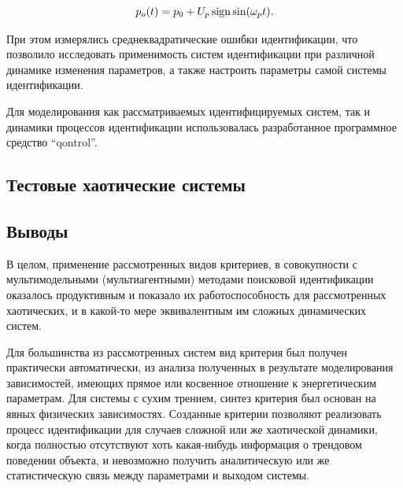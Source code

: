 \documentclass[a4paper,paratype,12pt,fouriernc]{cmonogra}
\begin{document}
\begin{equation}
  p_o(t) = p_0 + U_{p} \operatorname*{sign} \sin( \omega_{p} t ).
  \label{atu:eq:p_sign}
\end{equation}

При этом измерялись среднеквадратические ошибки идентификации,
что позволило исследовать применимость систем идентификации
при различной динамике изменения параметров, а также
настроить параметры самой системы идентификации.

Для моделирования как рассматриваемых идентифицируемых систем,
так и динамики процессов идентификации использовалась разработанное
программное средство ``qontrol''.


\subsection*{Тестовые хаотические системы }


% 












\subsection*{Выводы}

В целом, применение рассмотренных видов критериев, в совокупности
с мультимодельными (мультиагентными) методами поисковой идентификации
оказалось продуктивным и показало их
работоспособность для рассмотренных хаотических, и в какой-то мере эквивалентным им
сложных динамических систем.



Для большинства из рассмотренных систем вид критерия
был получен практически автоматически, из анализа полученных
в результате моделирования зависимостей, имеющих прямое или косвенное отношение
к энергетическим параметрам. Для системы с сухим трением,
синтез критерия был основан на явных физических зависимостях.
Созданные критерии позволяют реализовать процесс идентификации для случаев
сложной или же хаотической динамики,
когда полностью отсутствуют хоть какая-нибудь информация о
трендовом поведении объекта, и невозможно получить аналитическую
или же статистическую связь между параметрами и выходом системы.
\end{document}
